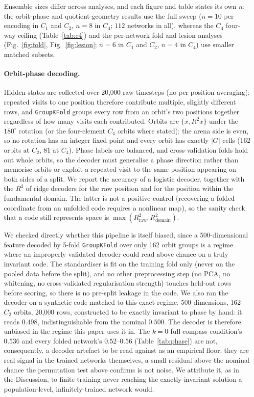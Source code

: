 \documentclass[9pt,lineno]{elife}
\begin{document}
Ensemble sizes differ across analyses, and each figure and table states its own $n$: the orbit-phase
and quotient-geometry results use the full sweep ($n=10$ per encoding in $C_1$ and $C_2$, $n=8$ in
$C_4$; $112$ networks in all), whereas the $C_4$ four-way ceiling (Table~\ref{tab:c4}) and the
per-network fold and lesion analyses (Fig.~\ref{fig:fold}, Fig.~\ref{fig:lesion}; $n=6$ in $C_1$ and
$C_2$, $n=4$ in $C_4$) use smaller matched subsets.

\paragraph{Orbit-phase decoding.} Hidden states are collected over 20{,}000 raw timesteps (no
per-position averaging); repeated visits to one position therefore contribute multiple, slightly
different rows, and \texttt{GroupKFold} groups every row from an orbit's two positions together
regardless of how many visits each contributed. Orbits are $\{x, R^2x\}$ under the $180^\circ$
rotation (or the four-element $C_4$ orbits where stated); the arena side is even, so no rotation
has an integer fixed point and every orbit has exactly $|G|$ cells (162 orbits at $C_2$, 81 at
$C_4$). Phase labels are balanced, and cross-validation folds hold out whole orbits, so the decoder
must generalise a phase direction rather than memorise orbits or exploit a repeated visit to the
same position appearing on both sides of a split. We report the accuracy of a logistic decoder,
together with the $R^2$ of ridge decoders for the raw position and for the position within the
fundamental domain. The latter is not a positive control (recovering a folded coordinate from an
unfolded code requires a nonlinear map), so the sanity check that a code still represents space is
$\max(R^2_{\text{raw}}, R^2_{\text{domain}})$.

We checked directly whether this pipeline is itself biased, since a 500-dimensional feature decoded
by 5-fold \texttt{GroupKFold} over only 162 orbit groups is a regime where an improperly validated
decoder could read above chance on a truly invariant code. The standardiser is fit on the training
fold only (never on the pooled data before the split), and no other preprocessing step (no PCA, no
whitening, no cross-validated regularisation strength) touches held-out rows before scoring, so
there is no pre-split leakage in the code. We also ran the decoder on a synthetic code matched to
this exact regime, 500 dimensions, 162 $C_2$ orbits, 20{,}000 rows, constructed to be exactly
invariant to phase by hand: it reads $0.498$, indistinguishable from the nominal $0.500$. The
decoder is therefore unbiased in the regime this paper uses it in. The $k{=}0$ full-compass
condition's $0.536$ and every folded network's $0.52$--$0.56$ (Table~\ref{tab:phase}) are not,
consequently, a decoder artefact to be read against as an empirical floor; they are real signal in
the trained networks themselves, a small residual above the nominal chance the permutation test
above confirms is not noise. We attribute it, as in the Discussion, to finite training never
reaching the exactly invariant solution a population-level, infinitely-trained network would.
\end{document}

